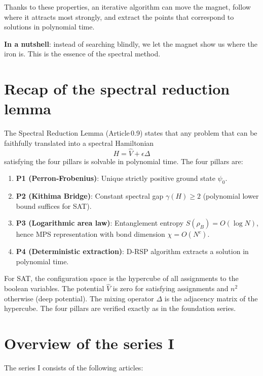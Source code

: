 \documentclass[11pt,a4paper]{article}
\begin{document}
Thanks to these properties, an iterative algorithm can move the magnet, follow where it attracts most strongly, and extract the points that correspond to solutions in polynomial time.

\textbf{In a nutshell}: instead of searching blindly, we let the magnet show us where the iron is. This is the essence of the spectral method.

\section{Recap of the spectral reduction lemma}

The Spectral Reduction Lemma (Article 0.9) states that any problem that can be faithfully translated into a spectral Hamiltonian
\[
H = \hat{V} + \epsilon\Delta
\]
satisfying the four pillars is solvable in polynomial time. The four pillars are:

\begin{enumerate}
\item \textbf{P1 (Perron‑Frobenius)}: Unique strictly positive ground state \(\psi_0\).
\item \textbf{P2 (Kithima Bridge)}: Constant spectral gap \(\gamma(H) \ge 2\) (polynomial lower bound suffices for SAT).
\item \textbf{P3 (Logarithmic area law)}: Entanglement entropy \(S(\rho_B)=O(\log N)\), hence MPS representation with bond dimension \(\chi = O(N^c)\).
\item \textbf{P4 (Deterministic extraction)}: D‑RSP algorithm extracts a solution in polynomial time.
\end{enumerate}

For SAT, the configuration space is the hypercube of all assignments to the boolean variables. The potential \(\hat{V}\) is zero for satisfying assignments and \(n^2\) otherwise (deep potential). The mixing operator \(\Delta\) is the adjacency matrix of the hypercube. The four pillars are verified exactly as in the foundation series.

\section{Overview of the series I}

The series I consists of the following articles:
\end{document}
